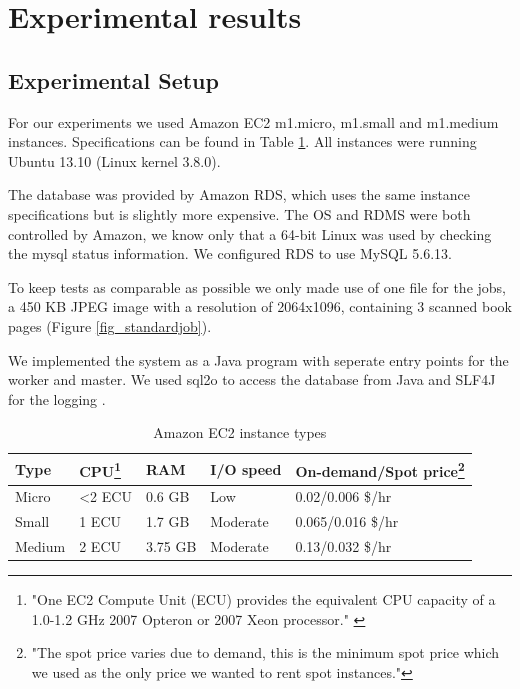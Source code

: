 \documentclass[a4paper]{IEEEtran}
\begin{document}
\section{Experimental results}
\label{sec:experimentalresults}

\subsection{Experimental Setup}

For our experiments we used Amazon EC2 m1.micro, m1.small and m1.medium instances. Specifications can be found in Table \ref{amazoninstancespec}. All instances were running Ubuntu 13.10 (Linux kernel 3.8.0).

The database was provided by Amazon RDS, which uses the same instance specifications but is slightly more expensive. The OS and RDMS were both controlled by Amazon, we know only that a 64-bit Linux was used by checking the mysql status information. We configured RDS to use MySQL 5.6.13.

To keep tests as comparable as possible we only made use of one file for the jobs, a 450 KB JPEG image with a resolution of 2064x1096, containing 3 scanned book pages (Figure \ref{fig_standardjob}).

We implemented the system as a Java program with seperate entry points for the worker and master. We used sql2o \cite{sql2o} to access the database from Java and SLF4J for the logging \cite{SLF4J}.

\begin{savenotes}
\begin{table}
\caption{Amazon EC2 instance types}
\label{amazoninstancespec}
\centering
\begin{tabular}{| l | l | l | l | l |}
\hline
Type & CPU\footnote{"One EC2 Compute Unit (ECU) provides the equivalent CPU capacity of a 1.0-1.2 GHz 2007 Opteron or 2007 Xeon processor." \cite{amazonecu}} & RAM & I/O speed & On-demand/Spot price\footnote{"The spot price varies due to demand, this is the minimum spot price which we used as the only price we wanted to rent spot instances."} \\ \hline
Micro & \textless 2 ECU & 0.6 GB & Low & 0.02/0.006 \$/hr \\ \hline
Small & 1 ECU & 1.7 GB & Moderate & 0.065/0.016 \$/hr \\ \hline
Medium & 2 ECU & 3.75 GB & Moderate & 0.13/0.032 \$/hr \\ \hline
\end{tabular}
\end{table}
\end{savenotes}
\end{document}

